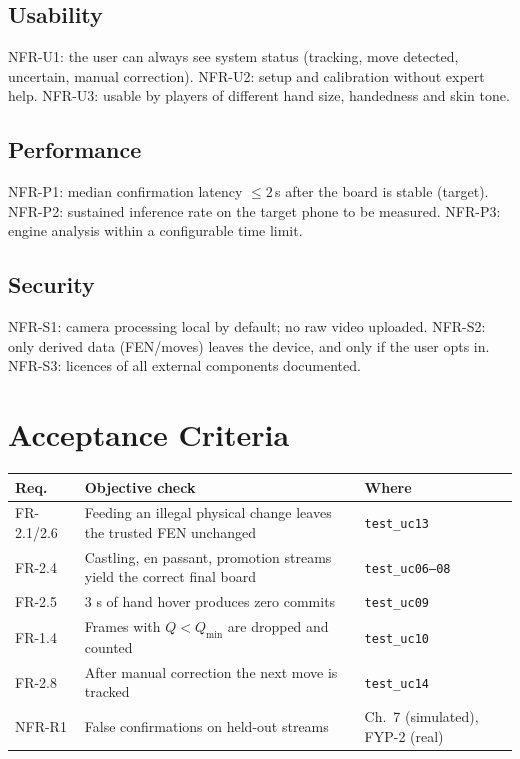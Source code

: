 \subsection{Usability}
NFR-U1: the user can always see system status (tracking, move detected, uncertain, manual correction). NFR-U2: setup and calibration without expert help. NFR-U3: usable by players of different hand size, handedness and skin tone.
\subsection{Performance}
NFR-P1: median confirmation latency $\leq 2$\,s after the board is stable (target). NFR-P2: sustained inference rate on the target phone to be measured. NFR-P3: engine analysis within a configurable time limit.
\subsection{Security}
NFR-S1: camera processing local by default; no raw video uploaded. NFR-S2: only derived data (FEN/moves) leaves the device, and only if the user opts in. NFR-S3: licences of all external components documented.

\section{Acceptance Criteria}
\begin{longtable}{p{}p{}p{}}
\toprule Req. & Objective check & Where\\ \midrule
FR-2.1/2.6 & Feeding an illegal physical change leaves the trusted FEN unchanged & \texttt{test\_uc13}\\
FR-2.4 & Castling, en passant, promotion streams yield the correct final board & \texttt{test\_uc06--08}\\
FR-2.5 & 3 s of hand hover produces zero commits & \texttt{test\_uc09}\\
FR-1.4 & Frames with $Q<Q_{\min}$ are dropped and counted & \texttt{test\_uc10}\\
FR-2.8 & After manual correction the next move is tracked & \texttt{test\_uc14}\\
NFR-R1 & False confirmations on held-out streams & Ch.~7 (simulated), FYP-2 (real)\\
\bottomrule
\end{longtable}


